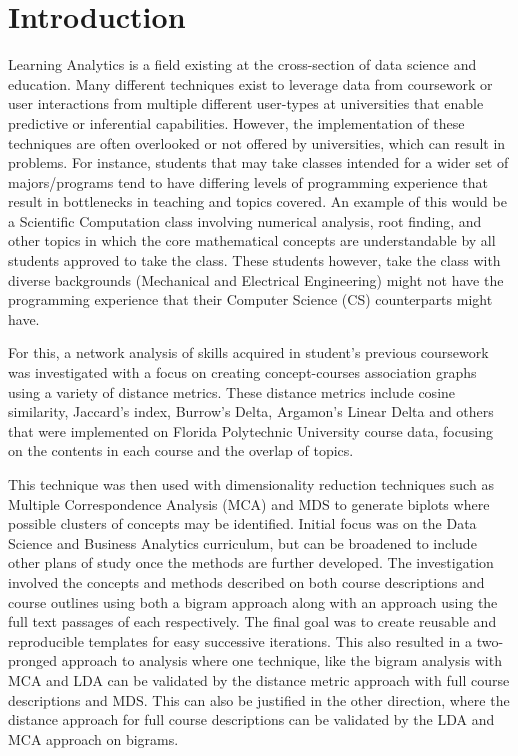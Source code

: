 %
%
%

\chapter{Introduction}
\label{introduction}



\hspace*{0.5cm} Learning Analytics is a field existing at the cross-section of data science and education. 
Many different techniques exist to leverage data from coursework or user interactions from multiple different user-types at universities that enable predictive 
or inferential capabilities. However, the implementation of these techniques are often overlooked or not offered by universities, which can result in problems. 
For instance, students that may take classes intended for a wider set of majors/programs tend to have differing levels of programming experience that result in 
bottlenecks in teaching and topics covered. An example of this would be a Scientific Computation class involving numerical analysis, root finding, and other topics in which the
 core mathematical concepts are understandable by all students approved to take the class. These students however, take the class  with diverse backgrounds (Mechanical and 
 Electrical Engineering) might not have the programming experience that their Computer Science (CS) counterparts might have.  

For this, a network analysis of skills acquired in student’s previous coursework was investigated with a focus on creating concept-courses association graphs using 
a variety of distance metrics.  These distance metrics include cosine similarity,  Jaccard's index, Burrow's Delta, Argamon's Linear Delta and others \cite{lan_tag-aware_2014} 
\cite{lan_sparse_nodate}  that were implemented on Florida Polytechnic University course data, focusing on the contents in each course and the overlap of topics. 

\indent This technique was then used with dimensionality reduction techniques such as Multiple Correspondence Analysis (MCA) and MDS to generate biplots where 
possible clusters of concepts may be identified.  Initial focus was on the Data Science and Business Analytics curriculum, but can be broadened to include other plans of 
study once the methods are further developed. The investigation involved the concepts and methods described on both course descriptions and course outlines using both a 
bigram approach along with an approach using the full text passages of each respectively.  The final goal was to create reusable and reproducible templates for easy successive 
iterations. This also resulted in a two-pronged approach to analysis where one technique, like the bigram analysis with MCA and LDA can be validated by the distance metric approach
with full course descriptions and MDS. This can also be justified in the other direction, where the distance approach for full course descriptions can be validated by the LDA and 
MCA approach on bigrams. 
